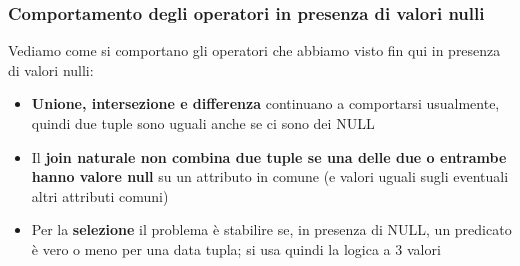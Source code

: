 \documentclass[12pt]{article}
\begin{document}
\subsubsection{Comportamento degli operatori in presenza di valori nulli}
Vediamo come si comportano gli operatori che abbiamo visto fin qui in presenza di valori nulli:
\begin{itemize}
    \item \textbf{Unione, intersezione e differenza} continuano a comportarsi usualmente, quindi due tuple sono uguali anche se ci sono dei NULL
    \item Il \textbf{join naturale non combina due tuple se una delle due o entrambe hanno valore null} su un attributo in comune (e valori uguali sugli eventuali altri attributi comuni)
    \item Per la \textbf{selezione} il problema è stabilire se, in presenza di NULL, un predicato è vero o meno per una data tupla; si usa quindi la logica a 3 valori
\end{itemize}
\end{document}
